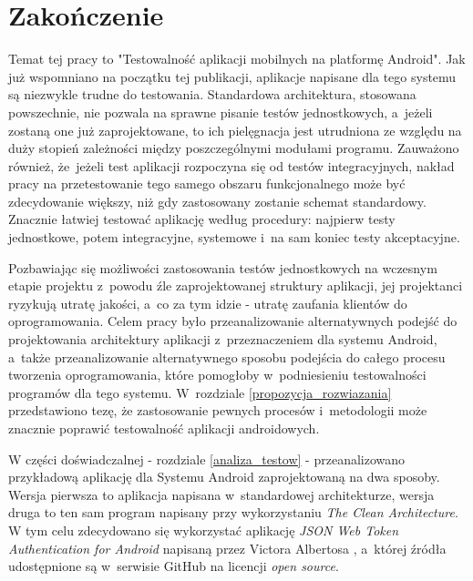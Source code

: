 \chapter*{Zakończenie}
\label{zakonczenie}

Temat tej pracy to "Testowalność aplikacji mobilnych na platformę Android". Jak już wspomniano na początku tej publikacji, aplikacje napisane dla tego systemu są niezwykle trudne do testowania. Standardowa architektura, stosowana powszechnie, nie pozwala na sprawne pisanie testów jednostkowych, a~jeżeli zostaną one już zaprojektowane, to ich pielęgnacja jest utrudniona ze względu na duży stopień zależności między poszczególnymi modułami programu. Zauważono również, że~jeżeli test aplikacji rozpoczyna się od testów integracyjnych, nakład pracy na przetestowanie tego samego obszaru funkcjonalnego może być zdecydowanie większy, niż gdy zastosowany zostanie schemat standardowy. Znacznie łatwiej testować aplikację według procedury: najpierw testy jednostkowe, potem integracyjne, systemowe i~na sam koniec testy akceptacyjne. 

Pozbawiając się możliwości zastosowania testów jednostkowych na wczesnym etapie projektu z~powodu źle zaprojektowanej struktury aplikacji, jej projektanci ryzykują utratę jakości, a~co za tym idzie - utratę zaufania klientów do oprogramowania. Celem pracy było przeanalizowanie alternatywnych podejść do projektowania architektury aplikacji z~przeznaczeniem dla systemu Android, a~także przeanalizowanie alternatywnego sposobu podejścia do całego procesu tworzenia oprogramowania, które pomogłoby w~podniesieniu testowalności programów dla tego systemu. W~rozdziale \ref{propozycja_rozwiazania} przedstawiono tezę, że zastosowanie pewnych procesów i~metodologii może znacznie poprawić testowalność aplikacji androidowych.

W części doświadczalnej - rozdziale \ref{analiza_testow} - przeanalizowano przykładową aplikację dla Systemu Android zaprojektowaną na dwa sposoby. Wersja pierwsza to aplikacja napisana w~standardowej architekturze, wersja druga to ten sam program napisany przy wykorzystaniu \textit{The Clean Architecture}. W tym celu zdecydowano się wykorzystać
aplikację \textit{JSON Web Token Authentication for Android} napisaną przez Victora Albertosa \cite{website:victor:aplication} , a~której źródła udostępnione są w~serwisie GitHub na licencji \textit{open source}.

